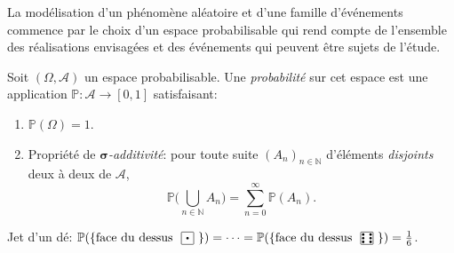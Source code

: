 La modélisation d'un phénomène aléatoire et d'une famille d'événements commence par le choix d'un espace probabilisable qui rend compte de l'ensemble des réalisations envisagées et des événements qui peuvent être sujets de l'étude.

\begin{definition}
	Soit $(\Omega,\mathcal{A})$ un espace probabilisable. Une \emph{probabilité} sur cet espace est une application $\mathbb{P}: \mathcal{A} \to [0,1]$ satisfaisant:
\begin{enumerate}[label=$(\roman*)$]
	\item $\mathbb{P} (\Omega) = 1$.
	\item Propriété de \emph{$\boldsymbol\sigma$-additivité}: pour toute suite $(A_n)_{n \in \mathbb{N}}$ d'éléments \emph{disjoints} deux à deux de $\mathcal{A}$,
	$$ \mathbb{P} \Big( \bigcup_{n \in \mathbb{N}} A_n \Big) = \sum_{n=0}^{\infty} \mathbb{P} (A_n) .$$
\end{enumerate}
\end{definition}
\begin{exemple}
	Jet d'un dé: $	 \P(\{\text{face du dessus \drawdie{1}}\}) = \cdots = \P( \{\text{face du dessus \drawdie{6}}\} ) = \frac 1 6 $.
\end{exemple} 

\sld{\vfill\pagebreak[5]}%



